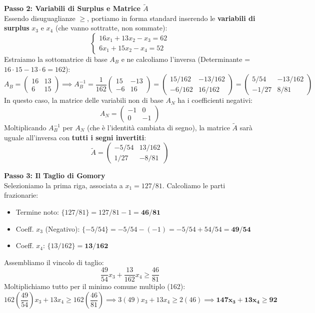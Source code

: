 \documentclass[12pt, a4paper]{article}
\begin{document}
	\vspace{0.4cm}
	\textbf{Passo 2: Variabili di Surplus e Matrice $\tilde{A}$}\\
	Essendo disuguaglianze $\geq$, portiamo in forma standard inserendo le \textbf{variabili di surplus} $x_3$ e $x_4$ (che vanno sottratte, non sommate):
	\[
	\begin{cases}
		16x_1 + 13x_2 - x_3 = 62 \\
		6x_1 + 15x_2 - x_4 = 52
	\end{cases}
	\]
	Estraiamo la sottomatrice di base $A_B$ e ne calcoliamo l'inversa (Determinante = $16 \cdot 15 - 13 \cdot 6 = 162$):
	\[
	A_B = \begin{pmatrix} 16 & 13 \\ 6 & 15 \end{pmatrix} \implies A_B^{-1} = \frac{1}{162} \begin{pmatrix} 15 & -13 \\ -6 & 16 \end{pmatrix} = \begin{pmatrix} 15/162 & -13/162 \\ -6/162 & 16/162 \end{pmatrix} = \begin{pmatrix} 5/54 & -13/162 \\ -1/27 & 8/81 \end{pmatrix}
	\]
	In questo caso, la matrice delle variabili non di base $A_N$ ha i coefficienti negativi:
	\[
	A_N = \begin{pmatrix} -1 & 0 \\ 0 & -1 \end{pmatrix}
	\]
	Moltiplicando $A_B^{-1}$ per $A_N$ (che è l'identità cambiata di segno), la matrice $\tilde{A}$ sarà uguale all'inversa con \textbf{tutti i segni invertiti}:
	\[
	\tilde{A} = \begin{pmatrix} -5/54 & 13/162 \\ 1/27 & -8/81 \end{pmatrix}
	\]
	
	\vspace{0.4cm}
	\textbf{Passo 3: Il Taglio di Gomory}\\
	Selezioniamo la prima riga, associata a $x_1 = 127/81$.
	Calcoliamo le parti frazionarie:
	\begin{itemize}[label=$\circ$, itemsep=2pt, leftmargin=1.5cm]
		\item Termine noto: $\{127/81\} = 127/81 - 1 = \mathbf{46/81}$
		\item Coeff. $x_3$ (Negativo): $\{-5/54\} = -5/54 - (-1) = -5/54 + 54/54 = \mathbf{49/54}$
		\item Coeff. $x_4$: $\{13/162\} = \mathbf{13/162}$
	\end{itemize}
	Assembliamo il vincolo di taglio:
	\[
	\frac{49}{54} x_3 + \frac{13}{162} x_4 \geq \frac{46}{81}
	\]
	Moltiplichiamo tutto per il minimo comune multiplo (162):
	\[
	162 \left( \frac{49}{54} \right) x_3 + 13 x_4 \geq 162 \left( \frac{46}{81} \right) \implies 3(49)x_3 + 13x_4 \geq 2(46) \implies \mathbf{147x_3 + 13x_4 \geq 92}
	\]
	
\end{document}
